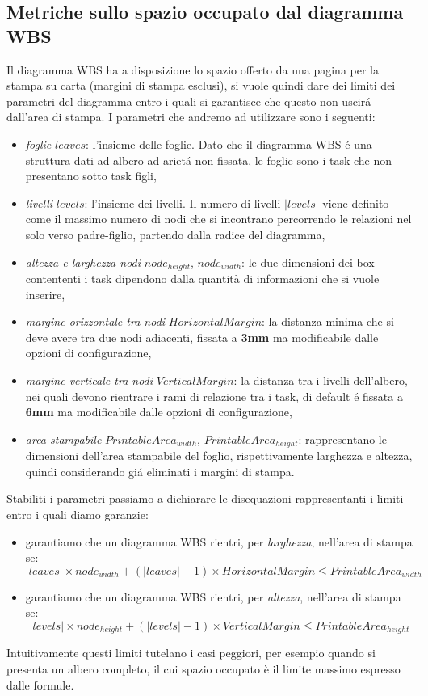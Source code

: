 \subsection{Metriche sullo spazio occupato dal diagramma WBS}
Il diagramma WBS ha a disposizione lo spazio offerto da una pagina per la
stampa su carta (margini di stampa esclusi), si vuole quindi dare dei limiti dei parametri del diagramma entro i quali si garantisce che questo non uscir\'a dall'area di stampa. I parametri che andremo ad utilizzare sono i seguenti:
\begin{itemize}
	\item \emph{foglie} $leaves$: l'insieme delle foglie. Dato che il diagramma WBS \'e una struttura dati ad albero ad ariet\'a non fissata, le foglie sono i task che non presentano sotto task figli,
	\item \emph{livelli} $levels$: l'insieme dei livelli. Il numero di livelli $|levels|$ viene definito come il massimo numero di nodi che si incontrano percorrendo le relazioni nel solo verso padre-figlio, partendo dalla radice del diagramma,
	\item \emph{altezza e larghezza nodi} $node_{height}$, $node_{width}$: le due dimensioni dei box contententi i task dipendono dalla quantità di informazioni che si vuole inserire,
	\item \emph{margine orizzontale tra nodi} $HorizontalMargin$: la distanza minima che si deve avere tra due nodi adiacenti, fissata a \textbf{3mm} ma modificabile dalle opzioni di configurazione,
	\item \emph{margine verticale tra nodi} $VerticalMargin$: la distanza tra i livelli
	dell'albero, nei quali devono rientrare i rami di relazione tra i task, di default \'e fissata a \textbf{6mm} ma modificabile dalle opzioni di configurazione,
	\item \emph{area stampabile} $PrintableArea_{width}$,
	$PrintableArea_{height}$: rappresentano le dimensioni dell'area stampabile del foglio, rispettivamente larghezza e altezza, quindi considerando gi\'a eliminati i margini di stampa.
\end{itemize}

Stabiliti i parametri passiamo a dichiarare le disequazioni rappresentanti i limiti entro i quali diamo garanzie:
\begin{itemize}
	\item garantiamo che un diagramma WBS rientri, per \emph{larghezza}, nell'area di stampa se:
	$$ |leaves| \times node_{width} + (|leaves| - 1) \times HorizontalMargin \leq PrintableArea_{width} $$
	\item garantiamo che un diagramma WBS rientri, per \emph{altezza}, nell'area di stampa se:
	$$ |levels| \times node_{height} + (|levels| - 1) \times VerticalMargin \leq PrintableArea_{height} $$
\end{itemize}
Intuitivamente questi limiti tutelano i casi peggiori, per esempio quando si
presenta un albero completo, il cui spazio occupato \`e il limite massimo espresso dalle formule.

